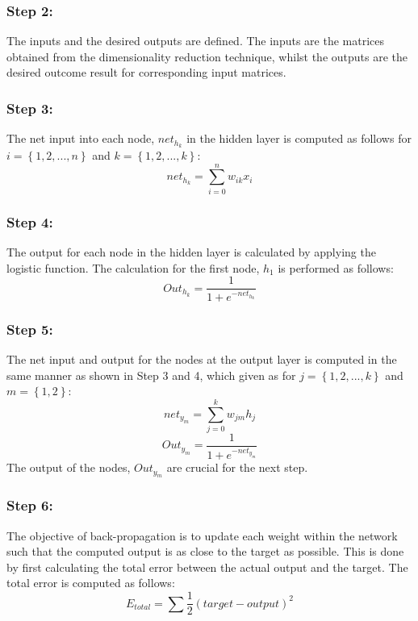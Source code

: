 \documentclass[11pt,twocolumn]{witseiepaper}
\begin{document}
	\subsubsection{Step 2:}
	The inputs and the desired outputs are defined. The inputs are the matrices obtained from the dimensionality reduction technique, whilst the outputs are the desired outcome result for corresponding input matrices.
	
	\subsubsection{Step 3:}
	The net input into each node, $net_{h_k}$ in the hidden layer is computed as follows for $i = \left\{1, 2, ..., n\right\}$ and $k = \left\{1, 2, ..., k\right\}$:
	\begin{equation}
		net_{h_k} = \sum_{i = 0}^{n} w_{ik}x_i 
	\end{equation}
	
	\subsubsection{Step 4:}
	The output for each node in the hidden layer is calculated by applying the logistic function. The calculation for the first node, $h_1$ is performed as follows:
	\begin{equation}
		Out_{h_k} = \frac{1}{1 + e^{-net_{h_k}}}
	\end{equation}
	
	\subsubsection{Step 5:}
	The net input and output for the nodes at the output layer is computed in the same manner as shown in Step 3 and 4, which given as for $j = \left\{1, 2, ..., k\right\}$ and $m = \left\{1, 2\right\}$:
	\begin{equation}
		net_{y_m} = \sum_{j = 0}^{k} w_{jm}h_j
	\end{equation}
	\begin{equation}
		Out_{y_m} = \frac{1}{1 + e^{-net_{y_m}}}
	\end{equation}
	The output of the nodes, $Out_{y_m}$ are crucial for the next step. 
	
	\subsubsection{Step 6:}
	The objective of back-propagation is to update each weight within the network such that the computed output is as close to the target as possible. This is done by first calculating the total error between the actual output and the target. The total error is computed as follows:
	\begin{equation}
		E_{total} = \sum \frac{1}{2} (target - output)^2
	\end{equation}
	
\end{document}
